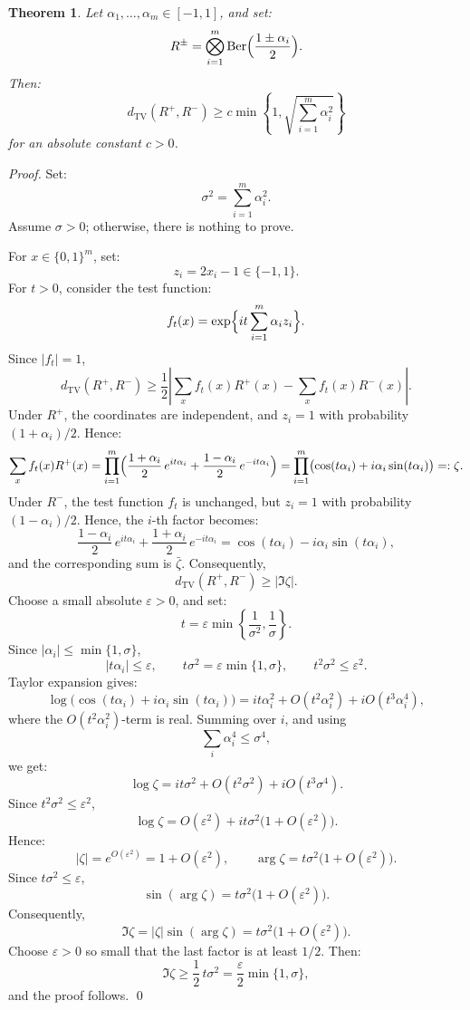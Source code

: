 \documentclass[10pt,a4paper]{amsart}
\newtheorem{theorem}{Theorem}
\begin{document}
\begin{theorem}\label{dephasing_thm}
Let \(\alpha_1,\ldots,\alpha_m\in[-1,1]\), and set:
\[
R^\pm
=
\bigotimes_{i=1}^m\mathrm{Ber}\Bigl(\frac{1\pm\alpha_i}2\Bigr).
\]
Then:
\[
d_{\mathrm{TV}}(R^+,R^-)
\ge
c\min\left\{
1,
\sqrt{\sum_{i=1}^m\alpha_i^2}
\right\}
\]
for an absolute constant \(c>0\).
\end{theorem}

\begin{proof}
Set:
\[
\sigma^2=\sum_{i=1}^m\alpha_i^2.
\]
Assume \(\sigma>0\); otherwise, there is nothing to prove.
\smallskip%

For \(x\in\{0,1\}^m\), set:
\[
z_i=2x_i-1\in\{-1,1\}.
\]
For \(t>0\), consider the test function:
\[
f_t(x)=\exp\Bigl\{it\sum_{i=1}^m\alpha_iz_i\Bigr\}.
\]
Since \(|f_t|=1\),
\[
d_{\mathrm{TV}}(R^+,R^-)
\ge
\frac12
\left|
\sum_xf_t(x)R^+(x)
-
\sum_xf_t(x)R^-(x)
\right|.
\]
Under \(R^+\), the coordinates are independent, and \(z_i=1\) with
probability \((1+\alpha_i)/2\). Hence:
\[
\sum_xf_t(x)R^+(x)
=
\prod_{i=1}^m
\Bigl(
\frac{1+\alpha_i}2\,e^{it\alpha_i}
+
\frac{1-\alpha_i}2\,e^{-it\alpha_i}
\Bigr)
=
\prod_{i=1}^m
\bigl(\cos(t\alpha_i)+i\alpha_i\sin(t\alpha_i)\bigr)
=:
\zeta.
\]
Under \(R^-\), the test function \(f_t\) is unchanged, but \(z_i=1\)
with probability \((1-\alpha_i)/2\). Hence, the \(i\)-th factor becomes:
\[
\frac{1-\alpha_i}2\,e^{it\alpha_i}
+
\frac{1+\alpha_i}2\,e^{-it\alpha_i}
=
\cos(t\alpha_i)-i\alpha_i\sin(t\alpha_i),
\]
and the corresponding sum is \(\bar\zeta\). Consequently,
\begin{equation}\label{imag_lower}
d_{\mathrm{TV}}(R^+,R^-)
\ge
|\Im\zeta|.
\end{equation}
Choose a small absolute \(\varepsilon>0\), and set:
\[
t
=
\varepsilon
\min\left\{
\frac1{\sigma^2},\frac1\sigma
\right\}.
\]
Since \(|\alpha_i|\le\min\{1,\sigma\}\),
\[
|t\alpha_i|\le\varepsilon,
\qquad
t\sigma^2=\varepsilon\min\{1,\sigma\},
\qquad
t^2\sigma^2\le\varepsilon^2.
\]
Taylor expansion gives:
\[
\log\bigl(\cos(t\alpha_i)+i\alpha_i\sin(t\alpha_i)\bigr)
=
it\alpha_i^2
+
O(t^2\alpha_i^2)
+
iO(t^3\alpha_i^4),
\]
where the \(O(t^2\alpha_i^2)\)-term is real. Summing
over \(i\), and using 
\[
\sum_i\alpha_i^4\le\sigma^4,
\]
we get:
\[
\log\zeta
=
it\sigma^2
+
O(t^2\sigma^2)
+
iO(t^3\sigma^4).
\]
Since \(t^2\sigma^2\le\varepsilon^2\),
\[
\log\zeta
=
O(\varepsilon^2)
+
it\sigma^2\bigl(1+O(\varepsilon^2)\bigr).
\]
Hence:
\[
|\zeta|
=
e^{O(\varepsilon^2)}
=
1+O(\varepsilon^2),
\qquad
\arg\zeta
=
t\sigma^2\bigl(1+O(\varepsilon^2)\bigr).
\]
Since \(t\sigma^2\le\varepsilon\),
\[
\sin(\arg\zeta)
=
t\sigma^2\bigl(1+O(\varepsilon^2)\bigr).
\]
Consequently,
\[
\Im\zeta
=
|\zeta|\sin(\arg\zeta)
=
t\sigma^2\bigl(1+O(\varepsilon^2)\bigr).
\]
Choose \(\varepsilon>0\) so small that the last factor is at least
\(1/2\). Then:
\[
\Im\zeta
\ge
\frac12\,t\sigma^2
=
\frac\varepsilon2\min\{1,\sigma\},
\]
and the proof follows. \qed
\end{proof}
\end{document}
